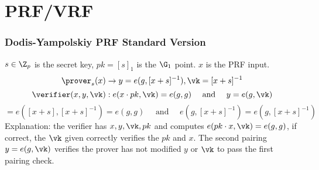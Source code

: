 
\section{PRF/VRF}
\subsubsection{Dodis-Yampolskiy PRF Standard Version} 
$s \in \Z_p$ is the secret key, $pk = [s]_1$ is the $\G_1 $ point. $x$ is the PRF input.
\[\prover_s(x) \rightarrow y = e(g,[x+s]^{-1}), \vk = [x + s]^{-1}\]
\[\verifier(x,y,\vk): e(x\cdot pk, \vk) = e(g,g)  \quad \text{ and } \quad y = e(g,\vk)\]
\[ = e([x + s], [x + s]^{-1}) = e(g,g) \quad \text{ and } \quad e(g,[x+s]^{-1}) = e(g,[x + s]^{-1})\]
Explanation: the verifier has $x, y, \vk, pk$ and computes $e(pk \cdot x, \vk) = e(g,g)$, if correct, the $\vk$ given correctly verifies the $pk$ and $x$. The second pairing $y = e(g,\vk)$ verifies the prover has not modified $y$ or $\vk$ to pass the first pairing check.

